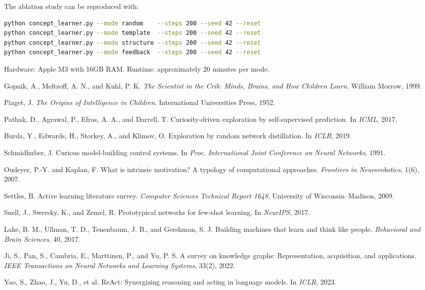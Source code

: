 \documentclass[conference]{IEEEtran}
\begin{document}
The ablation study can be reproduced with:

\begin{lstlisting}[language=bash,numbers=none]
python concept_learner.py --mode random    --steps 200 --seed 42 --reset
python concept_learner.py --mode template  --steps 200 --seed 42 --reset
python concept_learner.py --mode structure --steps 200 --seed 42 --reset
python concept_learner.py --mode feedback  --steps 200 --seed 42 --reset
\end{lstlisting}

Hardware: Apple M3 with 16GB RAM. Runtime: approximately 20 minutes per mode.


\begin{thebibliography}{12}

Gopnik, A., Meltzoff, A. N., and Kuhl, P. K.
\emph{The Scientist in the Crib: Minds, Brains, and How Children Learn}.
William Morrow, 1999.

Piaget, J.
\emph{The Origins of Intelligence in Children}.
International Universities Press, 1952.

Pathak, D., Agrawal, P., Efros, A. A., and Darrell, T.
Curiosity-driven exploration by self-supervised prediction.
In \emph{ICML}, 2017.

Burda, Y., Edwards, H., Storkey, A., and Klimov, O.
Exploration by random network distillation.
In \emph{ICLR}, 2019.

Schmidhuber, J.
Curious model-building control systems.
In \emph{Proc. International Joint Conference on Neural Networks}, 1991.

Oudeyer, P.-Y. and Kaplan, F.
What is intrinsic motivation? A typology of computational approaches.
\emph{Frontiers in Neurorobotics}, 1(6), 2007.

Settles, B.
Active learning literature survey.
\emph{Computer Sciences Technical Report 1648}, University of Wisconsin--Madison, 2009.

Snell, J., Swersky, K., and Zemel, R.
Prototypical networks for few-shot learning.
In \emph{NeurIPS}, 2017.

Lake, B. M., Ullman, T. D., Tenenbaum, J. B., and Gershman, S. J.
Building machines that learn and think like people.
\emph{Behavioral and Brain Sciences}, 40, 2017.

Ji, S., Pan, S., Cambria, E., Marttinen, P., and Yu, P. S.
A survey on knowledge graphs: Representation, acquisition, and applications.
\emph{IEEE Transactions on Neural Networks and Learning Systems}, 33(2), 2022.

Yao, S., Zhao, J., Yu, D., et al.
ReAct: Synergizing reasoning and acting in language models.
In \emph{ICLR}, 2023.

\end{thebibliography}
\end{document}
